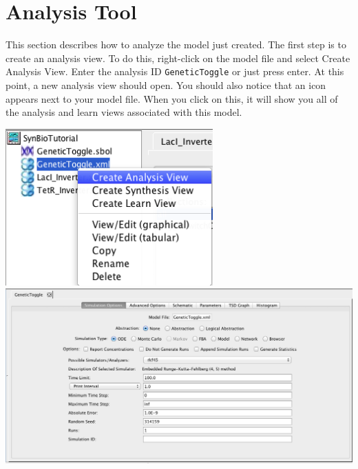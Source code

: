 \documentclass[titlepage,11pt]{article}
\begin{document}
\section{Analysis Tool}

This section describes how to analyze the model just created.  The first step is to create an analysis view.  To do this, right-click on the model file and select Create Analysis View.  Enter the analysis ID {\tt GeneticToggle} or just press enter.  At this point, a new analysis view should open.  You should also notice that an icon appears next to your model file.  When you click on this, it will show you all of the analysis and learn views associated with this model.

\begin{center}
\includegraphics[height=60mm]{screenshots/createAnalysisViewGT}\\
\includegraphics[width=160mm]{screenshots/analysisViewGT}
\end{center}
\end{document}

